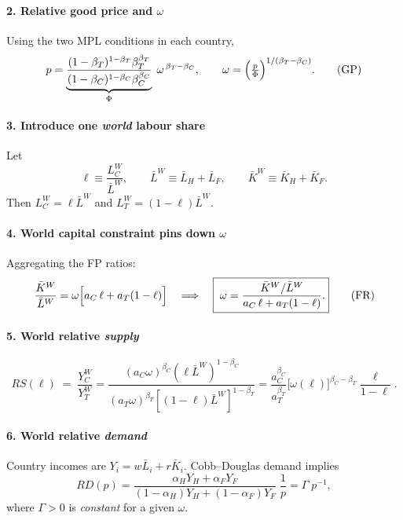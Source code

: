\documentclass[11pt,letterpaper]{article}
\begin{document}
\paragraph{2.  Relative good price and \(\omega\)}
Using the two MPL conditions in each country,
\[
p
   =\underbrace{\frac{(1-\beta_T)^{1-\beta_T}\beta_T^{\beta_T}}
                      {(1-\beta_C)^{1-\beta_C}\beta_C^{\beta_C}}}_{\Phi}
      \;\omega^{\,\beta_T-\beta_C},
\qquad
\omega
   =\Bigl(\tfrac{p}{\Phi}\Bigr)^{1/(\beta_T-\beta_C)}.
\tag{GP}
\]

\paragraph{3.  Introduce one \emph{world} labour share}
Let
\[
\ell
 \equiv\frac{L_{C}^W}{\bar L^W},
\qquad
\bar L^W\equiv\bar L_H+\bar L_F,
\qquad
\bar K^W\equiv\bar K_H+\bar K_F.
\]
Then \(L_{C}^W=\ell\bar L^W\) and
\(L_{T}^W=(1-\ell)\bar L^W\).

\paragraph{4.  World capital constraint pins down \(\omega\)}
Aggregating the FP ratios:
\[
\frac{\bar K^W}{\bar L^W}
   =\omega\Bigl[a_C\,\ell + a_T(1-\ell)\Bigr]
   \quad\Longrightarrow\quad
\boxed{\;
\omega
  =\frac{\bar K^W/\bar L^W}{a_C\,\ell+a_T(1-\ell)}.
}
\tag{FR}
\]

\paragraph{5.  World relative \emph{supply}}
\[
RS(\ell)
  \;=\;
  \frac{Y_C^W}{Y_T^W}
  =\frac{(a_C\omega)^{\beta_C}(\ell\bar L^W)^{1-\beta_C}}
         {(a_T\omega)^{\beta_T}[(1-\ell)\bar L^W]^{1-\beta_T}}
  =\frac{a_C^{\beta_C}}{a_T^{\beta_T}}
     \bigl[\omega(\ell)\bigr]^{\beta_C-\beta_T}
     \frac{\ell}{1-\ell}.
\tag{RS}
\]

\paragraph{6.  World relative \emph{demand}}
Country incomes are
\(Y_i=w\bar L_i+r\bar K_i\).
Cobb–Douglas demand implies
\[
RD(p)=\frac{\alpha_HY_H+\alpha_FY_F}
            {(1-\alpha_H)Y_H+(1-\alpha_F)Y_F}\;
      \frac{1}{p}
      =\Gamma\;p^{-1},
\]
where \(\Gamma>0\) is \emph{constant} for a given \(\omega\).
\end{document}
